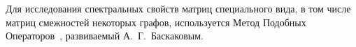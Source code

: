 Для исследования спектральных свойств матриц специального вида,
в том числе матриц смежностей некоторых графов,
используется Метод Подобных Операторов~\cite{baskakov-harmonic,baskakov1983},
развиваемый А.~Г.~Баскаковым.
